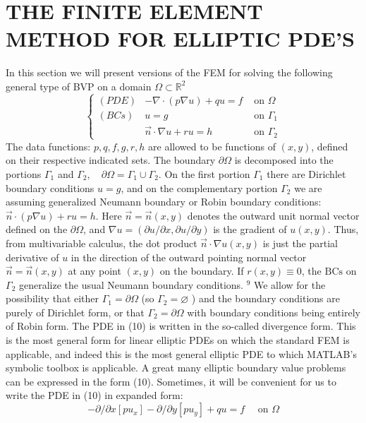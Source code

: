 \documentclass[../main.tex]{subfiles}
\begin{document}
\section{ THE FINITE ELEMENT METHOD FOR ELLIPTIC PDE'S 
}
In this section we will present versions of the FEM for solving the following general type of BVP on a domain $\Omega \subset \mathbb{R}^{2}$
\begin{equation}
\left\{\begin{array}{lll}
(P D E) & -\nabla \cdot(p \nabla u)+qu=f & \text { on } \Omega \\
(BCs) & u=g & \text { on } \Gamma_{1}\\
&\vec{n} \cdot \nabla u+ru=h  & \text { on } \Gamma_{2}
\end{array}\right.
\end{equation}
The data functions: $p, q, f, g, r, h$ are allowed to be functions of $(x, y)$, defined on their respective indicated sets. The boundary $\partial \Omega$ is decomposed into the portions $\Gamma_{1}$ and $\Gamma_{2}, \quad \partial \Omega=\Gamma_{1} \cup \Gamma_{2}$. On the first portion $\Gamma_{1}$ there are Dirichlet boundary conditions $u=g$, and on the complementary portion $\Gamma_{2}$ we are assuming generalized Neumann boundary or Robin boundary conditions: $\vec{n} \cdot(p \nabla u)+r u=h$. Here $\vec{n}=\vec{n}(x, y)$ denotes the outward unit normal vector defined on the $\partial \Omega$, and $\nabla u=(\partial u / \partial x, \partial u / \partial y)$ is the gradient of $u(x, y)$. Thus, from multivariable calculus, the dot product $\vec{n} \cdot \nabla u(x, y)$ is just the partial derivative of $u$ in the direction of the outward pointing normal vector $\vec{n}=\vec{n}(x, y)$ at any point $(x, y)$ on the boundary. If $r(x, y) \equiv 0$, the $\mathrm{BCs}$ on $\Gamma_{2}$ generalize the usual Neumann boundary conditions. ${ }^{9}$ We allow for the possibility that either $\Gamma_{1}=\partial \Omega$ (so $\Gamma_{2}=\varnothing$ ) and the boundary conditions are purely of Dirichlet form, or that $\Gamma_{2}=\partial \Omega$ with boundary conditions being entirely of Robin form. The PDE in (10) is written in the so-called divergence form. This is the most general form for linear elliptic PDEs on which the standard FEM is applicable, and indeed this is the most general elliptic PDE to which MATLAB's symbolic toolbox is applicable. A great many elliptic boundary value problems can be expressed in the form (10). Sometimes, it will be convenient for us to write the PDE in (10) in expanded form:
$$
-\partial / \partial x\left[p u_{x}\right]-\partial / \partial y\left[p u_{y}\right]+q u=f \quad \text { on } \Omega
$$
\end{document}
